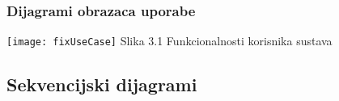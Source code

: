 			\eject
				\subsubsection{Dijagrami obrazaca uporabe\\}
					
				\texttt{[image: fixUseCase]}
				Slika 3.1 Funkcionalnosti korisnika sustava
				\eject		
				
			\subsection{Sekvencijski dijagrami}
				
